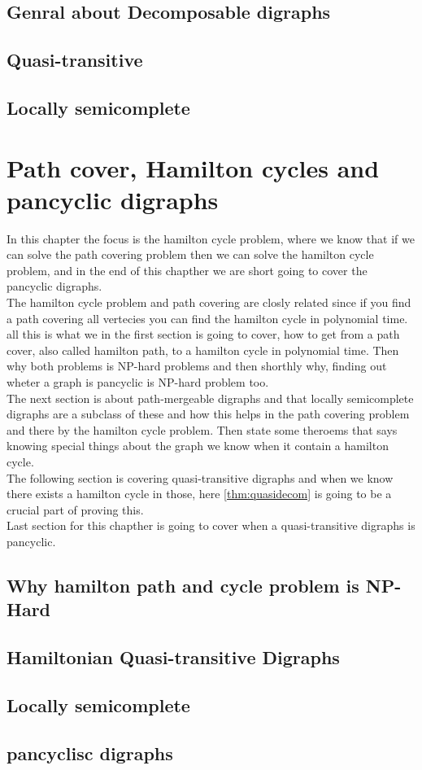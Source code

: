 \section{Genral about Decomposable digraphs}
\label{sec:gdecomposable}

\section{Quasi-transitive}
\label{sec:quasi}

\section{Locally semicomplete}
\label{sec:locally}


\chapter{Path cover, Hamilton cycles and pancyclic digraphs}
\label{chap:hamilton}
In this chapter the focus is the hamilton cycle problem, where we know that if we can solve the path covering problem then we can solve the hamilton cycle problem, and in the end of this chapther we are short going to cover the pancyclic digraphs.\\
The hamilton cycle problem and path covering are closly related since if you find a path covering all vertecies you can find the hamilton cycle in polynomial time. all this is what we in the first section is going to cover, how to get from a path cover, also called hamilton path, to a hamilton cycle in polynomial time. Then why both problems is NP-hard problems and then shorthly why, finding out wheter a graph is pancyclic is NP-hard problem too.\\
The next section is about path-mergeable digraphs and that locally semicomplete digraphs are a subclass of these and how this helps in the path covering problem and there by the hamilton cycle problem. Then state some theroems that says knowing special things about the graph we know when it contain a hamilton cycle. \\
The following section is covering quasi-transitive digraphs and when we know there exists a hamilton cycle in those, here \autoref{thm:quasidecom} is going to be a crucial part of proving this. \\
Last section for this chapther is going to cover when a quasi-transitive digraphs is pancyclic.

\section{Why hamilton path and cycle problem is NP-Hard}
\label{sec:hNP}

\section{Hamiltonian Quasi-transitive Digraphs}
\label{sec:hquasi}

\section{Locally semicomplete}
\label{sec:hlocally}

\section{pancyclisc digraphs}
\label{sec:pancyclic}

